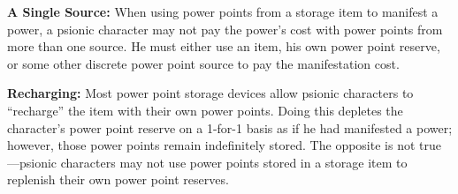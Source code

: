 \textbf{A Single Source:} When using power points from a storage item to manifest a power, a psionic character may not pay the power's cost with power points from more than one source. He must either use an item, his own power point reserve, or some other discrete power point source to pay the manifestation cost.

\textbf{Recharging:} Most power point storage devices allow psionic characters to ``recharge'' the item with their own power points. Doing this depletes the character's power point reserve on a 1-for-1 basis as if he had manifested a power; however, those power points remain indefinitely stored. The opposite is not true---psionic characters may not use power points stored in a storage item to replenish their own power point reserves.

